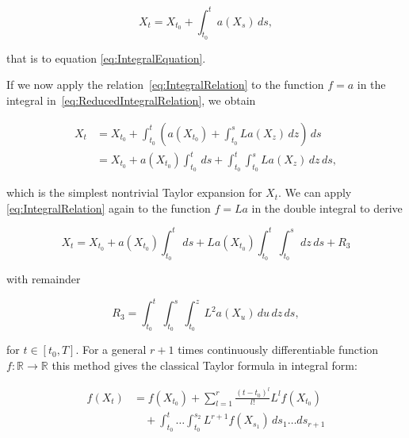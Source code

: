 \begin{equation}\label{eq:ReducedIntegralRelation}
    X_t = X_{t_0} + \int_{t_0}^t a(X_s) \, ds,
\end{equation}

\noindent that is to equation \eqref{eq:IntegralEquation}.

If we now apply the relation~\eqref{eq:IntegralRelation} to the function $f = a$ in the integral in~\eqref{eq:ReducedIntegralRelation}, we obtain

\begin{equation}\label{eq:FirstTaylorExpansion}
    \begin{split}
        X_t &= X_{t_0} + \int_{t_0}^t \left( a(X_{t_0}) + \int_{t_0}^s La(X_z) \, dz \right) \, ds \\
        &= X_{t_0} + a(X_{t_0}) \int_{t_0}^t \, ds + \int_{t_0}^t \int_{t_0}^s La(X_z) \, dz \, ds,
    \end{split}
\end{equation}

\noindent which is the simplest nontrivial Taylor expansion for $X_t$. We can apply \eqref{eq:IntegralRelation} again to the function $f = La$ in the double integral to derive

\begin{equation}\label{eq:SecondTaylorExpansion}
    X_t = X_{t_0} + a(X_{t_0}) \int_{t_0}^t \, ds + La(X_{t_0}) \int_{t_0}^t \int_{t_0}^s \, dz \, ds + R_3
\end{equation}

\noindent with remainder

\begin{equation}\label{eq:RemainderTerm}
    R_3 = \int_{t_0}^t \int_{t_0}^s \int_{t_0}^z L^2 a(X_u) \, du \, dz \, ds,
\end{equation}

\noindent for $t \in [t_0, T]$. For a general $r+1$ times continuously differentiable function $f : \mathbb{R} \to \mathbb{R}$ this method gives the classical Taylor formula in integral form:

\begin{equation}\label{eq:GeneralTaylorFormula}
    \begin{split}
        f(X_t) &= f(X_{t_0}) + \sum_{l=1}^r \frac{(t-t_0)^l}{l!} L^l f(X_{t_0}) \\
        &\quad + \int_{t_0}^t \dots \int_{t_0}^{s_2} L^{r+1} f(X_{s_1}) \, ds_1 \dots ds_{r+1}
    \end{split}
\end{equation}

